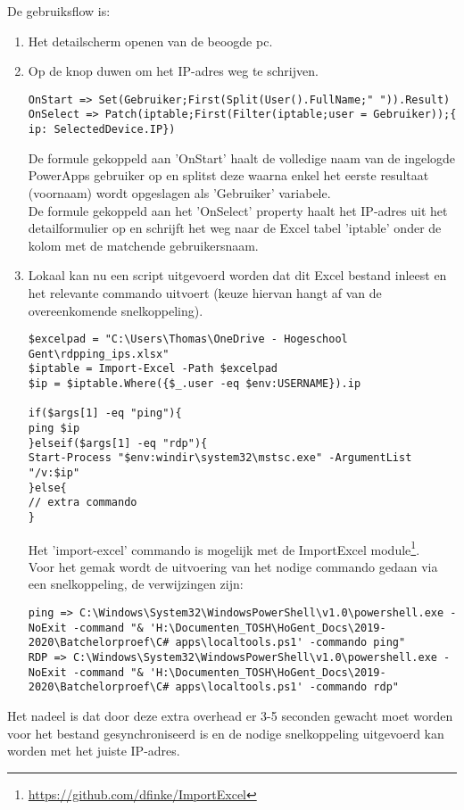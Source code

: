 De gebruiksflow is:
\begin{enumerate}
    \item Het detailscherm openen van de beoogde pc.
    \item Op de knop duwen om het IP-adres weg te schrijven.
\begin{lstlisting}
OnStart => Set(Gebruiker;First(Split(User().FullName;" ")).Result)
OnSelect => Patch(iptable;First(Filter(iptable;user = Gebruiker));{ ip: SelectedDevice.IP})
\end{lstlisting}
    De formule gekoppeld aan 'OnStart' haalt de volledige naam van de ingelogde PowerApps gebruiker op en splitst deze waarna enkel het eerste resultaat (voornaam) wordt opgeslagen als 'Gebruiker' variabele.\\
    De formule gekoppeld aan het 'OnSelect' property haalt het IP-adres uit het detailformulier op en schrijft het weg naar de Excel tabel 'iptable' onder de kolom met de matchende gebruikersnaam.
    \item Lokaal kan nu een script uitgevoerd worden dat dit Excel bestand inleest en het relevante commando uitvoert (keuze hiervan hangt af van de overeenkomende snelkoppeling).
\begin{lstlisting}[style=powershellStyle]
$excelpad = "C:\Users\Thomas\OneDrive - Hogeschool Gent\rdpping_ips.xlsx"
$iptable = Import-Excel -Path $excelpad
$ip = $iptable.Where({$_.user -eq $env:USERNAME}).ip

if($args[1] -eq "ping"){
ping $ip
}elseif($args[1] -eq "rdp"){
Start-Process "$env:windir\system32\mstsc.exe" -ArgumentList "/v:$ip"
}else{
// extra commando
}
\end{lstlisting}
    Het 'import-excel' commando is mogelijk met de ImportExcel module\footnote{\url{https://github.com/dfinke/ImportExcel}}.\\
    Voor het gemak wordt de uitvoering van het nodige commando gedaan via een snelkoppeling, de verwijzingen zijn:
\begin{lstlisting}
ping => C:\Windows\System32\WindowsPowerShell\v1.0\powershell.exe -NoExit -command "& 'H:\Documenten_TOSH\HoGent_Docs\2019-2020\Batchelorproef\C# apps\localtools.ps1' -commando ping"
RDP => C:\Windows\System32\WindowsPowerShell\v1.0\powershell.exe -NoExit -command "& 'H:\Documenten_TOSH\HoGent_Docs\2019-2020\Batchelorproef\C# apps\localtools.ps1' -commando rdp"
\end{lstlisting}
\end{enumerate}

Het nadeel is dat door deze extra overhead er 3-5 seconden gewacht moet worden voor het bestand gesynchroniseerd is en de nodige snelkoppeling uitgevoerd kan worden met het juiste IP-adres.

